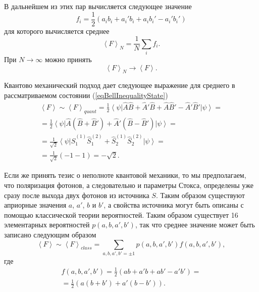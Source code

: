 В дальнейшем из этих пар вычисляется следующее значение
\begin{equation}
f_i = \frac{1}{2}\left(
a_i b_i + a_i' b_i + a_i b_i' - a_i' b_i'
\right)
\nonumber
\end{equation}
для которого вычисляется среднее
\begin{equation}
\left<F\right>_N = \frac{1}{N}\sum_i f_i.
\label{eqEntangFmain}
\end{equation}
При $N \rightarrow \infty$ можно принять
\begin{equation}
\left<F\right>_N \rightarrow \left<F\right>.
\nonumber
\end{equation}

Квантово механический подход дает следующее выражение для среднего в
рассматриваемом состоянии (\ref{eqBellInequalityState}) 
\begin{eqnarray}
 \left<F\right> \sim \left<F\right>_{quant} 
=\frac{1}{2}
\left<\psi\right|
\hat{A}\hat{B} + \hat{A}'\hat{B} + \hat{A}\hat{B}' - \hat{A}'\hat{B}'
\left|\psi\right> = 
\nonumber \\
=\frac{1}{2}
\left<\psi\right|
\hat{A}\left(\hat{B} + \hat{B}'\right) + \hat{A}' \left(\hat{B}  -
\hat{B}' \right)
\left|\psi\right> = 
\nonumber \\
= \frac{1}{\sqrt{2}}
\left<\psi\right|
\hat{S}_1^{(1)}\hat{S}_1^{(2)} + \hat{S}_2^{(1)}\hat{S}_2^{(2)}
\left|\psi\right> =
\nonumber \\
= \frac{1}{\sqrt{2}}
\left(-1 - 1\right) = - \sqrt{2}.
\label{eqEntangQuant}
\end{eqnarray}

Если же принять тезис о неполноте квантовой механики, то мы
предполагаем, что поляризация фотонов, а следовательно и параметры
Стокса, определены уже сразу после выхода двух фотонов из источника
$S$.  
Таким образом существуют априорные значения $a$, $a'$, $b$ и $b'$,
а свойства источника могут быть описаны с помощью
классической теории вероятностей.
Таким образом существует 16 элементарных
вероятностей $p\left(a,b,a',b'\right)$, так что среднее значение может
быть записано следующим образом
\begin{equation}
 \left<F\right> \sim \left<F\right>_{class} 
=\sum_{a,b,a',b'=\pm 1} 
p\left(a,b,a',b'\right) f\left(a,b,a',b'\right),
\label{eqEntangClassFuncPre}
\end{equation}
где 
\begin{eqnarray}
 f\left(a,b,a',b'\right) = \frac{1}{2} 
\left(
ab + a'b + ab' - a'b'
\right) = 
\nonumber \\
=
\frac{1}{2} 
\left(
a \left(b + b'\right) + a' \left(b - b'\right)
\right).
\label{eqEntangClassFunc}
\end{eqnarray}

